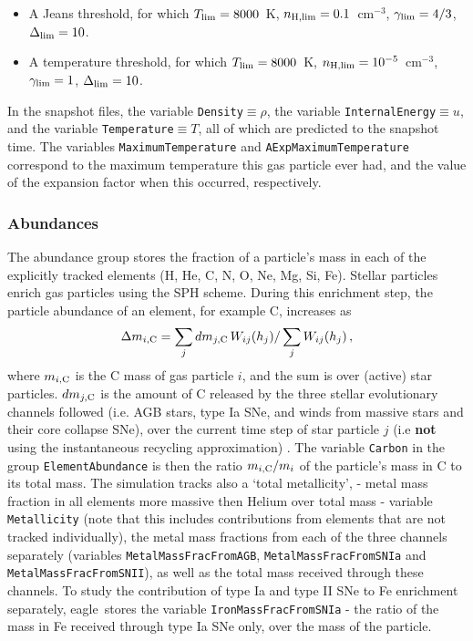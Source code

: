 \documentclass[10pt, a4paper]{article}
\newcommand{\eagle}{{\sc eagle}}
\begin{document}
\begin{itemize} 

\item A Jeans threshold, for which $T_{\rm lim}=8000$~K, $n_{\rm H,
lim}=0.1$~cm$^{-3}$, $\gamma_{\rm lim}=4/3$, $\Delta_{\rm lim}=10$.

\item A temperature threshold, for which $T_{\rm lim}=8000$~K, $n_{\rm H,
lim}=10^{-5}$~cm$^{-3}$, $\gamma_{\rm lim}=1$, $\Delta_{\rm lim}=10$.

\end{itemize}

In the snapshot files, the variable \texttt{Density}$\equiv \rho$, the variable
\texttt{InternalEnergy}$\equiv u$, and the variable \texttt{Temperature}$\equiv
T$, all of which are predicted to the snapshot time. The variables
\texttt{MaximumTemperature} and \texttt{AExpMaximumTemperature} correspond to
the maximum temperature this gas particle ever had, and the value of the
expansion factor when this occurred, respectively. 

\subsubsection{Abundances} \label{SecAbundances} The abundance group stores
the fraction of a particle's mass in each of the explicitly tracked elements
(H, He, C, N, O, Ne, Mg, Si, Fe). Stellar particles enrich gas particles using
the SPH scheme. During this enrichment step, the particle abundance of an
element, for example C, increases as \begin{equation} \Delta m_{i, {\rm C}} =
\sum_j dm_{j, {\rm C}}\,W_{ij}(h_j)/ \sum_j W_{ij}(h_j)\,, \end{equation} where
$m_{i, {\rm C}}$ is the C mass of gas particle $i$, and the sum is over
(active) star particles. $dm_{j, {\rm C}}$ is the amount of C released by the
three stellar evolutionary channels followed (i.e. AGB stars, type Ia SNe, and
winds from massive stars and their core collapse SNe), over the current time
step of star particle $j$ (i.e {\bf not} using the instantaneous recycling
approximation) .  The variable \texttt{Carbon} in the group
\texttt{ElementAbundance} is then the ratio $m_{i, {\rm C}}/m_i$ of the
particle's mass in C to its total mass. The simulation tracks also a \lq total
metallicity\rq,  - metal mass fraction in all elements more massive then Helium
over total mass - variable \texttt{Metallicity} (note that this includes
contributions from elements that are not tracked individually), the metal mass
fractions from each of the three channels separately (variables
\texttt{MetalMassFracFromAGB}, \texttt{MetalMassFracFromSNIa} and
\texttt{MetalMassFracFromSNII}), as well as the total mass received through
these channels. To study the contribution of type Ia and type II SNe to Fe
enrichment separately, \eagle\ stores the variable
\texttt{IronMassFracFromSNIa} - the ratio of the mass in Fe received through
type Ia SNe only, over the mass of the particle.
\end{document}
